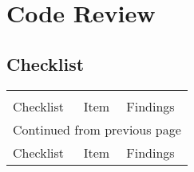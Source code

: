 \documentclass[11pt]{article}
\begin{document}
\newpage

\section{Code Review}
\label{sec:org7c3332c}
\subsection{Checklist}
\label{sec:org9d2fcef}
\begin{longtable}{|m{2.0cm}|m{3.0cm}|m{8.0cm}|}
 &  & \\
Checklist & Item & Findings\\
\hline
\endfirsthead
\multicolumn{3}{l}{Continued from previous page} \\

Checklist & Item & Findings \\


\end{longtable}
\end{document}
